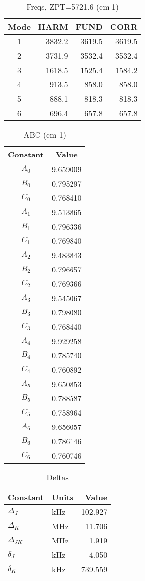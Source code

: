 \documentclass{article}
\begin{document}
\begin{table}[ht]
\centering
\caption{Freqs, ZPT=5721.6 (cm-1)}
\begin{tabular}{crrr}
Mode & HARM & FUND & CORR\\
\hline
1 & 3832.2 & 3619.5 & 3619.5\\
2 & 3731.9 & 3532.4 & 3532.4\\
3 & 1618.5 & 1525.4 & 1584.2\\
4 & 913.5 & 858.0 & 858.0\\
5 & 888.1 & 818.3 & 818.3\\
6 & 696.4 & 657.8 & 657.8\\
\end{tabular}
\end{table}

\begin{table}[ht]
\centering
\caption{ABC (cm-1)}
\begin{tabular}{cc}
Constant & Value\\
\hline
$A_0$ & 9.659009\\
$B_0$ & 0.795297\\
$C_0$ & 0.768410\\
$A_1$ & 9.513865\\
$B_1$ & 0.796336\\
$C_1$ & 0.769840\\
$A_2$ & 9.483843\\
$B_2$ & 0.796657\\
$C_2$ & 0.769366\\
$A_3$ & 9.545067\\
$B_3$ & 0.798080\\
$C_3$ & 0.768440\\
$A_4$ & 9.929258\\
$B_4$ & 0.785740\\
$C_4$ & 0.760892\\
$A_5$ & 9.650853\\
$B_5$ & 0.788587\\
$C_5$ & 0.758964\\
$A_6$ & 9.656057\\
$B_6$ & 0.786146\\
$C_6$ & 0.760746\\
\end{tabular}
\end{table}

\begin{table}[ht]
\centering
\caption{Deltas}
\begin{tabular}{llr}
Constant & Units & Value\\
\hline
$\Delta_{J}$ & kHz & 102.927\\
$\Delta_{K}$ & MHz & 11.706\\
$\Delta_{JK}$ & MHz & 1.919\\
$\delta_{J}$ & kHz & 4.050\\
$\delta_{K}$ & kHz & 739.559\\
\end{tabular}
\end{table}
\end{document}
